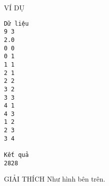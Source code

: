 VÍ DỤ  
\begin{verbatim}
Dữ liệu
9 3
2.0
0 0
0 1
1 1
2 1
2 2
3 2
3 3
4 1
4 3
1 2
2 3
3 4

Kết quả
2828
\end{verbatim}
   GIẢI THÍCH  
Như hình bên trên.